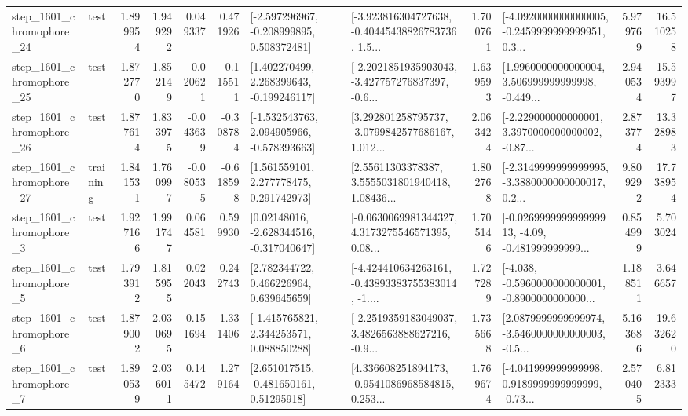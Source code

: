 \begin{tabular}{llrrrrllrlrr}
 step\_1601\_chromophore\_24 &      test &      1.899954 &    1.949292 &      0.049337 &  0.471926 &   [-2.597296967, -0.208999895, 0.508372481] &  [-3.923816304727638, -0.40445438826783736, 1.5... &       1.700761 &  [-4.0920000000000005, -0.2459999999999951, 0.3... &            5.979769 &         16.510258 \\
 step\_1601\_chromophore\_25 &      test &      1.872770 &    1.852149 &     -0.020621 & -0.115511 &    [1.402270499, 2.268399643, -0.199246117] &  [-2.2021851935903043, -3.427757276837397, -0.6... &       1.639593 &  [1.9960000000000004, 3.506999999999998, -0.449... &            2.940534 &         15.593997 \\
 step\_1601\_chromophore\_26 &      test &      1.877614 &    1.833975 &     -0.043639 & -0.308784 &   [-1.532543763, 2.094905966, -0.578393663] &  [3.292801258795737, -3.0799842577686167, 1.012... &       2.063424 &  [-2.229000000000001, 3.3970000000000002, -0.87... &            2.873774 &         13.328983 \\
 step\_1601\_chromophore\_27 &  training &      1.841531 &    1.760997 &     -0.080535 & -0.618598 &     [1.561559101, 2.277778475, 0.291742973] &  [2.55611303378387, 3.5555031801940418, 1.08436... &       1.802768 &  [-2.3149999999999995, -3.3880000000000017, 0.2... &            9.809292 &         17.738954 \\
  step\_1601\_chromophore\_3 &      test &      1.927166 &    1.991747 &      0.064581 &  0.599930 &    [0.02148016, -2.628344516, -0.317040647] &  [-0.0630069981344327, 4.3173275546571395, 0.08... &       1.705146 &  [-0.026999999999999913, -4.09, -0.481999999999... &            0.854999 &          5.703024 \\
  step\_1601\_chromophore\_5 &      test &      1.793912 &    1.815955 &      0.022043 &  0.242743 &     [2.782344722, 0.466226964, 0.639645659] &  [-4.424410634263161, -0.43893383755383014, -1.... &       1.727289 &  [-4.038, -0.5960000000000001, -0.8900000000000... &            1.188511 &          3.646657 \\
  step\_1601\_chromophore\_6 &      test &      1.879002 &    2.030695 &      0.151694 &  1.331406 &    [-1.415765821, 2.344253571, 0.088850288] &  [-2.2519359183049037, 3.4826563888627216, -0.9... &       1.735668 &  [2.0879999999999974, -3.5460000000000003, -0.5... &            5.163686 &         19.632620 \\
  step\_1601\_chromophore\_7 &      test &      1.890539 &    2.036011 &      0.145472 &  1.279164 &     [2.651017515, -0.481650161, 0.51295918] &  [4.336608251894173, -0.9541086968584815, 0.253... &       1.769674 &  [-4.041999999999998, 0.9189999999999999, -0.73... &            2.570405 &          6.812333 \\

\end{tabular}
